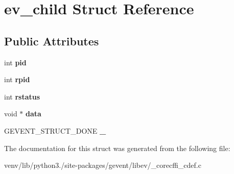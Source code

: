 \hypertarget{structev__child}{}\section{ev\+\_\+child Struct Reference}
\label{structev__child}
\subsection*{Public Attributes}
\begin{DoxyCompactItemize}
\item 
\mbox{\label{structev__child_aabe34b18e3fd1e6ad14a24e5c0e5ba13}} 
int {\bfseries pid}
\item 
\mbox{\label{structev__child_affe3dced46abf3638cf24b576c07c955}} 
int {\bfseries rpid}
\item 
\mbox{\label{structev__child_aac9c76006b1e0139dabae9a13775e775}} 
int {\bfseries rstatus}
\item 
\mbox{\label{structev__child_aeadc6b878e507962fd15af93342ea996}} 
void $\ast$ {\bfseries data}
\item 
\mbox{\label{structev__child_a37acf255cd9308ecc21d87fee76c9a6e}} 
G\+E\+V\+E\+N\+T\+\_\+\+S\+T\+R\+U\+C\+T\+\_\+\+D\+O\+NE {\bfseries \+\_\+}
\end{DoxyCompactItemize}


The documentation for this struct was generated from the following file\+:\begin{DoxyCompactItemize}
\item 
venv/lib/python3./site-\/packages/gevent/libev/\+\_\+corecffi\+\_\+cdef.\+c\end{DoxyCompactItemize}
